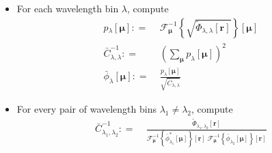 \documentclass[DM,authoryear,toc]{lsstdoc}
\begin{document}
\begin{itemize}
\item For each wavelength bin $\lambda$, compute
    \begin{align}
        p{_\lambda}[\bm{\mu}]
        \mathrel{\mathop:}= &\;
        \mathcal{F}_{\bm{\mu}}^{-1}\!\left\{
            \sqrt{\widetilde{\Phi}_{\lambda,\lambda}[\bm{r}]}
        \right\}\![
            \bm{\mu}
        ]
        \\
        \bar{C}^{-1}_{\lambda,\lambda}
        \mathrel{\mathop:}= &\;
        \left(\sum_{\bm{\mu}} p_{\lambda}[\bm{\mu}]\right)^2
        \\
        \bar{\phi}_{\lambda}[\bm{\mu}]
        \mathrel{\mathop:}= &\;
        \frac{p_{\lambda}[\bm{\mu}]}{\sqrt{\bar{C}_{\lambda,\lambda}}}
        \label{eqn:solution-diagonal-psfs}
    \end{align}
\item For every pair of wavelength bins $\lambda_1 \ne \lambda_2$, compute
    \begin{align}
        \bar{C}^{-1}_{\lambda_1,\lambda_2}
        \mathrel{\mathop:}= &\;
        \frac{
            \widetilde{\Phi}_{\lambda_1,\lambda_2}[\bm{r}]
        }{
            \mathcal{F}_{\bm{\mu}}^{-1}\!\left\{
                \bar{\phi}^*_{\lambda_1}[\bm{\mu}]
            \right\}\![\bm{r}]
            \;
            \mathcal{F}_{\bm{\mu}}^{-1}\!\left\{
                \bar{\phi}_{\lambda_2}[\bm{\mu}]
            \right\}\![\bm{r}]
        }
        \label{eqn:solution-offdiagonal-covariances}
    \end{align}
\end{itemize}

\end{document}
